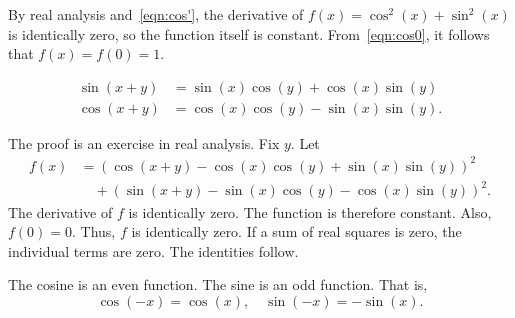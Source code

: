 

\begin{proved}
  By real analysis and~\eqref{eqn:cos'}, the
  derivative of  $f(x) = \cos^2(x) +\sin^2(x)$ is
  identically zero, so the function itself is constant.
  From~\eqref{eqn:cos0}, it follows that $f(x)=f(0)=1$.
  \swallowed\end{proved}



\begin{lemma}[]\label{lemma:sin-add}
\begin{align*}
\sin(x+y) &= \sin(x)\cos(y) + \cos(x)\sin(y)\\
\cos(x+y)  &= \cos(x)\cos(y) - \sin(x)\sin(y).
\end{align*}
\end{lemma}
%


\begin{proved}
The proof is an exercise in real analysis.
Fix $y$.  Let
\begin{align*}
f(x) &=(\cos(x+y) - \cos(x)\cos(y) +
\sin(x)\sin(y))^2 \\ 
  &\quad+ (\sin(x+y) -\sin(x)\cos(y) -\cos(x)\sin(y))^2.
\end{align*}
The derivative of $f$ is identically zero.  The function is therefore
constant.  Also, $f(0)=0$.  Thus, $f$ is
identically zero.  If a sum of real squares is zero, the individual
terms are zero. The identities follow.  \swallowed\end{proved}

\begin{lemma}[]\label{lemma:cos-neg}
  The cosine is an even function.  The sine is an odd function.  That
  is,
\[ 
\cos(-x) = \cos(x),\quad\sin(-x) =
    -\sin(x).
\] 
\end{lemma}
%
%
%


